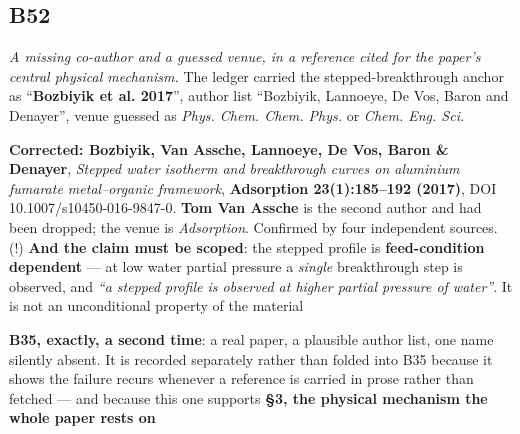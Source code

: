 \documentclass[10pt]{article}
\begin{document}
\subsection*{B52}\label{led:B52}
\begin{description}[leftmargin=0pt,itemsep=1pt]
\item[Defect.] \emph{A missing co-author and a guessed venue, in a reference cited for the paper's central physical mechanism.} The ledger carried the stepped-breakthrough anchor as ``\textbf{Bozbiyik et al. 2017}'', author list ``Bozbiyik, Lannoeye, De Vos, Baron and Denayer'', venue guessed as \emph{Phys. Chem. Chem. Phys.} or \emph{Chem. Eng. Sci.}
\item[Resolution.] \textbf{Corrected: Bozbiyik, Van Assche, Lannoeye, De Vos, Baron \& Denayer}, \emph{Stepped water isotherm and breakthrough curves on aluminium fumarate metal--organic framework}, \textbf{Adsorption 23(1):185--192 (2017)}, DOI 10.1007/s10450-016-9847-0. \textbf{Tom Van Assche} is the second author and had been dropped; the venue is \emph{Adsorption}. Confirmed by four independent sources. (!) \textbf{And the claim must be scoped}: the stepped profile is \textbf{feed-condition dependent} --- at low water partial pressure a \emph{single} breakthrough step is observed, and \emph{``a stepped profile is observed at higher partial pressure of water''}. It is not an unconditional property of the material
\item[Note.] \textbf{B35, exactly, a second time}: a real paper, a plausible author list, one name silently absent. It is recorded separately rather than folded into B35 because it shows the failure recurs whenever a reference is carried in prose rather than fetched --- and because this one supports \textbf{§3, the physical mechanism the whole paper rests on}
\end{description}
\end{document}
